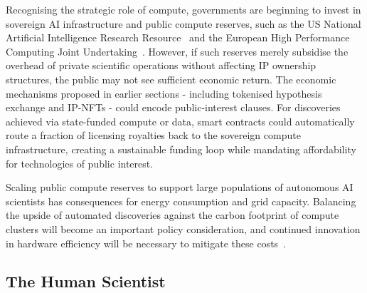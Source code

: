\documentclass[11pt, a4paper, twocolumn, goog]{google}
\begin{document}
Recognising the strategic role of compute, governments are beginning to invest in sovereign AI infrastructure and public compute reserves, such as the US National Artificial Intelligence Research Resource~\citep{parashar2023strengthening} and the European High Performance Computing Joint Undertaking~\citep{skordas2019toward}. However, if such reserves merely subsidise the overhead of private scientific operations without affecting IP ownership structures, the public may not see sufficient economic return. The economic mechanisms proposed in earlier sections - including tokenised hypothesis exchange and IP-NFTs - could encode public-interest clauses. For discoveries achieved via state-funded compute or data, smart contracts could automatically route a fraction of licensing royalties back to the sovereign compute infrastructure, creating a sustainable funding loop while mandating affordability for technologies of public interest.

Scaling public compute reserves to support large populations of autonomous AI scientists has consequences for energy consumption and grid capacity. Balancing the upside of automated discoveries against the carbon footprint of compute clusters will become an important policy consideration, and continued innovation in hardware efficiency will be necessary to mitigate these costs~\citep{wu2022sustainable, tamburrini2022ai, kirkpatrick2023carbon, luccioni2024environmental, luccioni2024power, luccioni2024light}.

\subsection{The Human Scientist}
\end{document}
